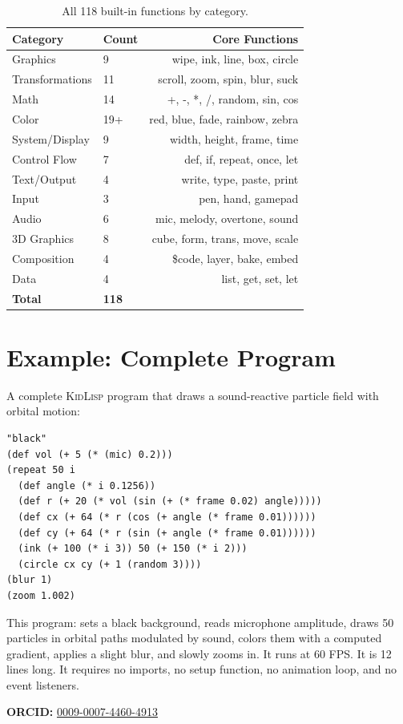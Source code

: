 \documentclass[10pt,letterpaper,twocolumn]{article}
\newcommand{\kl}{\textsc{KidLisp}}
\begin{document}
\begin{table}[h]
\small
\centering
\begin{tabularx}{\columnwidth}{Xlr}
\toprule
\textbf{Category} & \textbf{Count} & \textbf{Core Functions} \\
\midrule
Graphics & 9 & wipe, ink, line, box, circle \\
Transformations & 11 & scroll, zoom, spin, blur, suck \\
Math & 14 & +, -, *, /, random, sin, cos \\
Color & 19+ & red, blue, fade, rainbow, zebra \\
System/Display & 9 & width, height, frame, time \\
Control Flow & 7 & def, if, repeat, once, let \\
Text/Output & 4 & write, type, paste, print \\
Input & 3 & pen, hand, gamepad \\
Audio & 6 & mic, melody, overtone, sound \\
3D Graphics & 8 & cube, form, trans, move, scale \\
Composition & 4 & \$code, layer, bake, embed \\
Data & 4 & list, get, set, let \\
\midrule
\textbf{Total} & \textbf{118} & \\
\bottomrule
\end{tabularx}
\caption{All 118 built-in functions by category.}
\label{tab:builtins}
\end{table}

\section{Example: Complete Program}

A complete \kl{} program that draws a sound-reactive particle field with orbital motion:

\begin{lstlisting}
"black"
(def vol (+ 5 (* (mic) 0.2)))
(repeat 50 i
  (def angle (* i 0.1256))
  (def r (+ 20 (* vol (sin (+ (* frame 0.02) angle)))))
  (def cx (+ 64 (* r (cos (+ angle (* frame 0.01))))))
  (def cy (+ 64 (* r (sin (+ angle (* frame 0.01))))))
  (ink (+ 100 (* i 3)) 50 (+ 150 (* i 2)))
  (circle cx cy (+ 1 (random 3))))
(blur 1)
(zoom 1.002)
\end{lstlisting}

This program: sets a black background, reads microphone amplitude, draws 50 particles in orbital paths modulated by sound, colors them with a computed gradient, applies a slight blur, and slowly zooms in. It runs at 60 FPS. It is 12 lines long. It requires no imports, no setup function, no animation loop, and no event listeners.

\vspace{0.5em}
\noindent\textbf{ORCID:} \href{https://orcid.org/0009-0007-4460-4913}{0009-0007-4460-4913}



\end{document}
